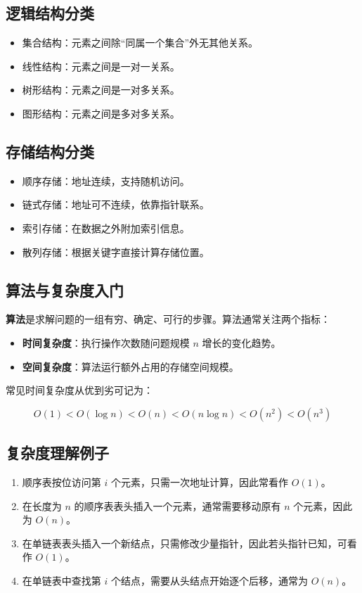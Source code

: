 \documentclass{../../note}
\begin{document}
\subsection{逻辑结构分类}

\begin{itemize}
  \item 集合结构：元素之间除“同属一个集合”外无其他关系。
  \item 线性结构：元素之间是一对一关系。
  \item 树形结构：元素之间是一对多关系。
  \item 图形结构：元素之间是多对多关系。
\end{itemize}

\subsection{存储结构分类}

\begin{itemize}
  \item 顺序存储：地址连续，支持随机访问。
  \item 链式存储：地址可不连续，依靠指针联系。
  \item 索引存储：在数据之外附加索引信息。
  \item 散列存储：根据关键字直接计算存储位置。
\end{itemize}

\subsection{算法与复杂度入门}

\textbf{算法}是求解问题的一组有穷、确定、可行的步骤。算法通常关注两个指标：

\begin{itemize}
  \item \textbf{时间复杂度}：执行操作次数随问题规模 $n$ 增长的变化趋势。
  \item \textbf{空间复杂度}：算法运行额外占用的存储空间规模。
\end{itemize}

常见时间复杂度从优到劣可记为：

\[
O(1) < O(\log n) < O(n) < O(n\log n) < O(n^2) < O(n^3)
\]

\subsection{复杂度理解例子}

\begin{enumerate}
  \item 顺序表按位访问第 $i$ 个元素，只需一次地址计算，因此常看作 $O(1)$。
  \item 在长度为 $n$ 的顺序表表头插入一个元素，通常需要移动原有 $n$ 个元素，因此为 $O(n)$。
  \item 在单链表表头插入一个新结点，只需修改少量指针，因此若头指针已知，可看作 $O(1)$。
  \item 在单链表中查找第 $i$ 个结点，需要从头结点开始逐个后移，通常为 $O(n)$。
\end{enumerate}
\end{document}
